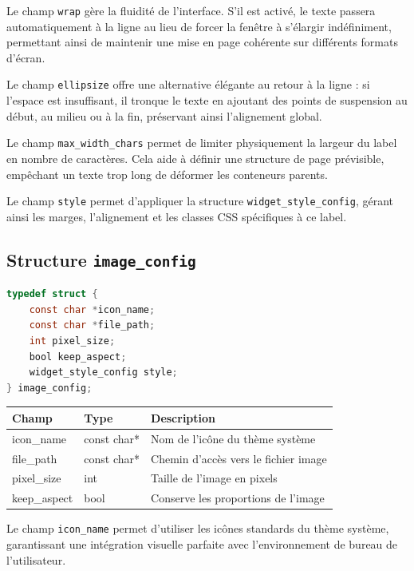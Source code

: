 Le champ \texttt{wrap} gère la fluidité de l'interface. S'il est activé, le texte passera automatiquement à la ligne au lieu de forcer la fenêtre à s'élargir indéfiniment, permettant ainsi de maintenir une mise en page cohérente sur différents formats d'écran.

Le champ \texttt{ellipsize} offre une alternative élégante au retour à la ligne : si l'espace est insuffisant, il tronque le texte en ajoutant des points de suspension au début, au milieu ou à la fin, préservant ainsi l'alignement global.

Le champ \texttt{max\_width\_chars} permet de limiter physiquement la largeur du label en nombre de caractères. Cela aide à définir une structure de page prévisible, empêchant un texte trop long de déformer les conteneurs parents.

Le champ \texttt{style} permet d'appliquer la structure \texttt{widget\_style\_config}, gérant ainsi les marges, l'alignement et les classes CSS spécifiques à ce label.

\bigskip

\subsection{Structure \texttt{image\_config}}
\begin{lstlisting}[language=C]
typedef struct {
    const char *icon_name;
    const char *file_path;
    int pixel_size;
    bool keep_aspect;
    widget_style_config style;
} image_config;
\end{lstlisting}

\begin{center}
\begin{tabular}{|l|l|p{5cm}|}
\hline
\textbf{Champ} & \textbf{Type} & \textbf{Description} \\
\hline
icon\_name & const char* & Nom de l'icône du thème système \\
\hline
file\_path & const char* & Chemin d'accès vers le fichier image \\
\hline
pixel\_size & int & Taille de l'image en pixels \\
\hline
keep\_aspect & bool & Conserve les proportions de l'image \\
\hline
\end{tabular}
\end{center}

\bigskip

Le champ \texttt{icon\_name} permet d'utiliser les icônes standards du thème système, garantissant une intégration visuelle parfaite avec l'environnement de bureau de l'utilisateur.

